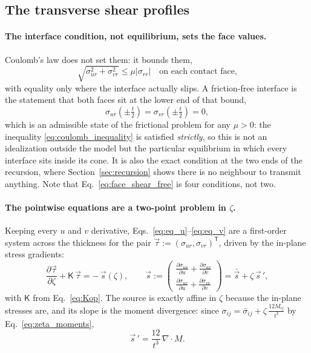 \documentclass[11pt]{article}
\begin{document}
\subsection{The transverse shear profiles}\label{sec:shear_profiles}
\paragraph{The interface condition, not equilibrium, sets the face values.}
Coulomb's law does not set them: it bounds them,
\begin{equation}\label{eq:coulomb_inequality}
    \boxed{\;\sqrt{\sigma_{ur}^{2} + \sigma_{vr}^{2}}
      \le \mu\left|\sigma_{rr}\right|
    \quad\text{on each contact face,}\;}
\end{equation}
with equality only where the interface actually slips. A friction-free interface
is the statement that both faces sit at the lower end of that bound,
\begin{equation}\label{eq:face_shear_free}
    \boxed{\;\sigma_{ur}\!\left(\pm\tfrac t2\right)
      = \sigma_{vr}\!\left(\pm\tfrac t2\right) = 0,\;}
\end{equation}
which is an admissible state of the frictional problem for any $\mu>0$: the
inequality \eqref{eq:coulomb_inequality} is satisfied \emph{strictly}, so this is
not an idealization outside the model but the particular equilibrium in which
every interface sits inside its cone. It is also the exact condition at the two
ends of the recursion, where Section~\ref{sec:recursion} shows there is no
neighbour to transmit anything. Note that Eq.~\eqref{eq:face_shear_free} is four
conditions, not two.

\paragraph{The pointwise equations are a two-point problem in $\zeta$.} Keeping
every $u$ and $v$ derivative, Eqs.~\eqref{eq:eq_u}--\eqref{eq:eq_v} are a
first-order system across the thickness for the pair
$\vec\tau := \left(\sigma_{ur},\sigma_{vr}\right)^{\mathsf T}$, driven by the
in-plane stress gradients:
\begin{equation}\label{eq:shear_bvp}
    \boxed{\;\frac{\partial \vec\tau}{\partial \zeta}
      + \mathsf K\,\vec\tau = -\,\vec s\left(\zeta\right),
    \qquad
    \vec s := \begin{pmatrix}
        \frac{\partial \sigma_{uu}}{\partial u}
          + \frac{\partial \sigma_{uv}}{\partial v}\\[4pt]
        \frac{\partial \sigma_{uv}}{\partial u}
          + \frac{\partial \sigma_{vv}}{\partial v}
      \end{pmatrix}
      = \bar{\vec s} + \zeta\,\vec s\,',\;}
\end{equation}
with $\mathsf K$ from Eq.~\eqref{eq:Kop}. The source is exactly affine in $\zeta$
because the in-plane stresses are, and its slope is the moment divergence:
since $\sigma_{ij} = \bar\sigma_{ij} + \zeta\,\frac{12 M_{ij}}{t^{3}}$ by
Eq.~\eqref{eq:zeta_moments},
\begin{equation}\label{eq:sprime_divM}
    \vec s\,' = \frac{12}{t^{3}}\,\nabla\cdot M .
\end{equation}
\end{document}
